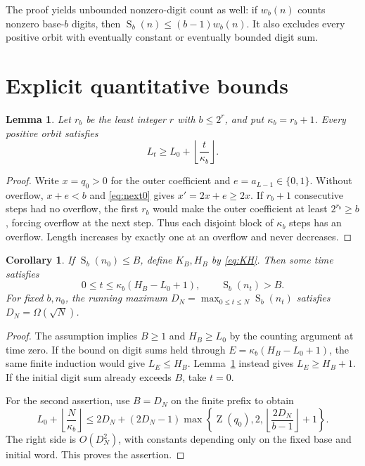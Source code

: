 \documentclass[11pt]{article}
\newtheorem{lemma}[theorem]{Lemma}
\newtheorem{corollary}[theorem]{Corollary}
\newcommand{\ds}{\operatorname{S}}
\newcommand{\zg}{\operatorname{Z}}
\begin{document}
The proof yields unbounded nonzero-digit count as well: if $w_b(n)$
counts nonzero base-$b$ digits, then
$\ds_b(n)\leq(b-1)w_b(n)$. It also excludes every positive orbit with
eventually constant or eventually bounded digit sum.

\section{Explicit quantitative bounds}
\begin{lemma}\label{lem:width}
Let $r_b$ be the least integer $r$ with $b\leq2^r$, and put
$\kappa_b=r_b+1$. Every positive orbit satisfies
\[
 L_t\geq L_0+\left\lfloor\frac{t}{\kappa_b}\right\rfloor.
\]
\end{lemma}
\begin{proof}
Write $x=q_0>0$ for the outer coefficient and $e=a_{L-1}\in\{0,1\}$.
Without overflow, $x+e<b$ and \eqref{eq:next0} gives
$x'=2x+e\geq2x$. If $r_b+1$ consecutive steps had no overflow,
the first $r_b$ would make the outer coefficient at least $2^{r_b}\geq b$,
forcing overflow at the next step. Thus each disjoint block of
$\kappa_b$ steps has an overflow. Length increases by exactly one at
an overflow and never decreases.
\end{proof}

\begin{corollary}\label{cor:escape}
If $\ds_b(n_0)\leq B$, define $K_B,H_B$ by \eqref{eq:KH}.
Then some time satisfies
\[
 0\leq t\leq\kappa_b(H_B-L_0+1),\qquad \ds_b(n_t)>B.
\]
For fixed $b,n_0$, the running maximum
$D_N=\max_{0\leq t\leq N}\ds_b(n_t)$ satisfies
$D_N=\Omega(\sqrt N)$.
\end{corollary}
\begin{proof}
The assumption implies $B\geq1$ and $H_B\geq L_0$ by the counting
argument at time zero. If the bound on digit sums held through
$E=\kappa_b(H_B-L_0+1)$, the same finite induction would give
$L_E\leq H_B$. Lemma~\ref{lem:width} instead gives $L_E\geq H_B+1$.
If the initial digit sum already exceeds $B$, take $t=0$.

For the second assertion, use $B=D_N$ on the finite prefix to obtain
\[
 L_0+\left\lfloor\frac N{\kappa_b}\right\rfloor
 \leq2D_N+(2D_N-1)
 \max\left\{\zg(q_0),2,
             \left\lfloor\frac{2D_N}{b-1}\right\rfloor+1\right\}.
\]
The right side is $O(D_N^2)$, with constants depending only on the
fixed base and initial word. This proves the assertion.
\end{proof}
\end{document}
